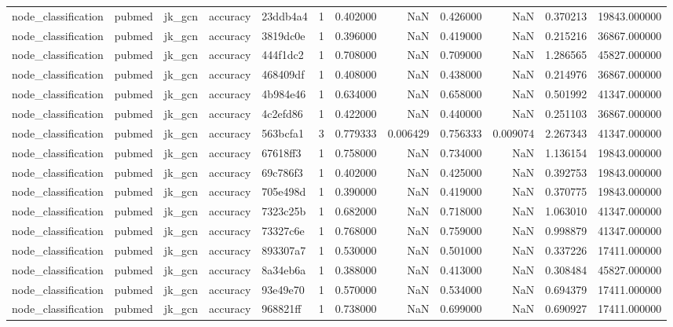 \begin{tabular}{lllllrrrrrrr}
node_classification & pubmed & jk_gcn & accuracy & 23ddb4a4 & 1 & 0.402000 & NaN & 0.426000 & NaN & 0.370213 & 19843.000000 \\
node_classification & pubmed & jk_gcn & accuracy & 3819dc0e & 1 & 0.396000 & NaN & 0.419000 & NaN & 0.215216 & 36867.000000 \\
node_classification & pubmed & jk_gcn & accuracy & 444f1dc2 & 1 & 0.708000 & NaN & 0.709000 & NaN & 1.286565 & 45827.000000 \\
node_classification & pubmed & jk_gcn & accuracy & 468409df & 1 & 0.408000 & NaN & 0.438000 & NaN & 0.214976 & 36867.000000 \\
node_classification & pubmed & jk_gcn & accuracy & 4b984e46 & 1 & 0.634000 & NaN & 0.658000 & NaN & 0.501992 & 41347.000000 \\
node_classification & pubmed & jk_gcn & accuracy & 4c2efd86 & 1 & 0.422000 & NaN & 0.440000 & NaN & 0.251103 & 36867.000000 \\
node_classification & pubmed & jk_gcn & accuracy & 563bcfa1 & 3 & 0.779333 & 0.006429 & 0.756333 & 0.009074 & 2.267343 & 41347.000000 \\
node_classification & pubmed & jk_gcn & accuracy & 67618ff3 & 1 & 0.758000 & NaN & 0.734000 & NaN & 1.136154 & 19843.000000 \\
node_classification & pubmed & jk_gcn & accuracy & 69c786f3 & 1 & 0.402000 & NaN & 0.425000 & NaN & 0.392753 & 19843.000000 \\
node_classification & pubmed & jk_gcn & accuracy & 705e498d & 1 & 0.390000 & NaN & 0.419000 & NaN & 0.370775 & 19843.000000 \\
node_classification & pubmed & jk_gcn & accuracy & 7323c25b & 1 & 0.682000 & NaN & 0.718000 & NaN & 1.063010 & 41347.000000 \\
node_classification & pubmed & jk_gcn & accuracy & 73327c6e & 1 & 0.768000 & NaN & 0.759000 & NaN & 0.998879 & 41347.000000 \\
node_classification & pubmed & jk_gcn & accuracy & 893307a7 & 1 & 0.530000 & NaN & 0.501000 & NaN & 0.337226 & 17411.000000 \\
node_classification & pubmed & jk_gcn & accuracy & 8a34eb6a & 1 & 0.388000 & NaN & 0.413000 & NaN & 0.308484 & 45827.000000 \\
node_classification & pubmed & jk_gcn & accuracy & 93e49e70 & 1 & 0.570000 & NaN & 0.534000 & NaN & 0.694379 & 17411.000000 \\
node_classification & pubmed & jk_gcn & accuracy & 968821ff & 1 & 0.738000 & NaN & 0.699000 & NaN & 0.690927 & 17411.000000 \\

\end{tabular}
